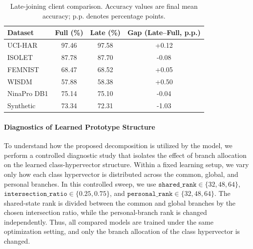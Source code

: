 \documentclass[lettersize,journal]{IEEEtran}
\newcommand{\rev}[1]{#1}
\begin{document}
\begin{table}[!ht]
\centering
\caption{\rev{Late-joining client comparison. Accuracy values are final mean accuracy; p.p. denotes percentage points.}}
\label{tab:late_joining}
\small
\begin{tabular}{lccc}
\toprule
\rev{Dataset} & \rev{Full (\%)} & \rev{Late (\%)} & \rev{Gap (Late--Full, p.p.)} \\
\midrule
\rev{UCI-HAR} & \rev{97.46} & \rev{97.58} & \rev{+0.12} \\
\rev{ISOLET} & \rev{87.78} & \rev{87.70} & \rev{-0.08} \\
\rev{FEMNIST} & \rev{68.47} & \rev{68.52} & \rev{+0.05} \\
\rev{WISDM} & \rev{57.88} & \rev{58.38} & \rev{+0.50} \\
\rev{NinaPro DB1} & \rev{75.14} & \rev{75.10} & \rev{-0.04} \\
\rev{Synthetic} & \rev{73.34} & \rev{72.31} & \rev{-1.03} \\
\bottomrule
\end{tabular}
\end{table}




\paragraph{Diagnostics of Learned Prototype Structure}
To understand how the proposed decomposition is utilized by the model, we perform a controlled diagnostic study that isolates the effect of branch allocation on the learned class-hypervector structure.
Within a fixed learning setup, we vary only how each class hypervector is distributed across the common, global, and personal branches.
In this controlled sweep, we use \(\texttt{shared\_rank}\in\{32,48,64\}\), \(\texttt{intersection\_ratio}\in\{0.25,0.75\}\), and \(\texttt{personal\_rank}\in\{32,48,64\}\).
The \rev{shared-state rank is divided between the common and global branches} by the chosen intersection ratio, while the \rev{personal-branch rank} is changed independently.
Thus, all compared models are trained under the same optimization setting, and only the branch allocation of the class hypervector is changed.
\end{document}
